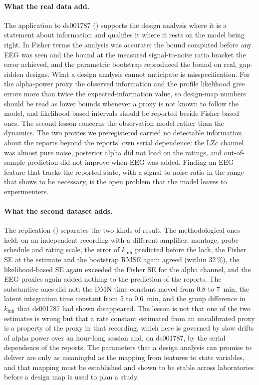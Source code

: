 \documentclass[12pt,a4paper]{article}
\theoremstyle{plain}
\theoremstyle{definition}
\theoremstyle{remark}
\newcommand{\kinh}{k_{\mathrm{inh}}}
\begin{document}
\paragraph{What the real data add.} The application to ds001787 () supports the design analysis where it is a statement about information and qualifies it where it rests on the model being right. In Fisher terms the analysis was accurate: the bound computed before any EEG was seen and the bound at the measured signal-to-noise ratio bracket the error achieved, and the parametric bootstrap reproduced the bound on real, gap-ridden designs. What a design analysis cannot anticipate is misspecification. For the alpha-power proxy the observed information and the profile likelihood give errors more than twice the expected-information value, so design-map numbers should be read as lower bounds whenever a proxy is not known to follow the model, and likelihood-based intervals should be reported beside Fisher-based ones. The second lesson concerns the observation model rather than the dynamics. The two proxies we preregistered carried no detectable information about the reports beyond the reports' own serial dependence: the LZc channel was almost pure noise, posterior alpha did not load on the ratings, and out-of-sample prediction did not improve when EEG was added. Finding an EEG feature that tracks the reported state, with a signal-to-noise ratio in the range that  shows to be necessary, is the open problem that the model leaves to experimenters.

\paragraph{What the second dataset adds.} The replication () separates the two kinds of result. The methodological ones held: on an independent recording with a different amplifier, montage, probe schedule and rating scale, the error of $\kinh$ predicted before the lock, the Fisher SE at the estimate and the bootstrap RMSE again agreed (within 32\,\%), the likelihood-based SE again exceeded the Fisher SE for the alpha channel, and the EEG proxies again added nothing to the prediction of the reports. The substantive ones did not: the DMN time constant moved from 0.8 to 7~min, the latent integration time constant from 5 to 0.6~min, and the group difference in $\kinh$ that ds001787 had shown disappeared. The lesson is not that one of the two estimates is wrong but that a rate constant estimated from an uncalibrated proxy is a property of the proxy in that recording, which here is governed by slow drifts of alpha power over an hour-long session and, on ds001787, by the serial dependence of the reports. The parameters that a design analysis can promise to deliver are only as meaningful as the mapping from features to state variables, and that mapping must be established and shown to be stable across laboratories before a design map is used to plan a study.
\end{document}
